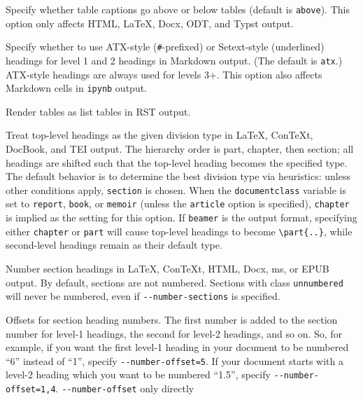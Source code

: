 \documentclass[
  b5paper
]{book}
\begin{document}
\begin{description}
Specify whether table captions go above or below tables (default is
\texttt{above}). This option only affects HTML, LaTeX, Docx, ODT, and
Typst output.
\item[\texttt{-\/-markdown-headings=setext}\textbar{}\texttt{atx}]
Specify whether to use ATX-style (\texttt{\#}-prefixed) or Setext-style
(underlined) headings for level 1 and 2 headings in Markdown output.
(The default is \texttt{atx}.) ATX-style headings are always used for
levels 3+. This option also affects Markdown cells in \texttt{ipynb}
output.
\item[\texttt{-\/-list-tables{[}=true\textbar{}false{]}}]
Render tables as list tables in RST output.
\item[\texttt{-\/-top-level-division=default}\textbar{}\texttt{section}\textbar{}\texttt{chapter}\textbar{}\texttt{part}]
Treat top-level headings as the given division type in LaTeX, ConTeXt,
DocBook, and TEI output. The hierarchy order is part, chapter, then
section; all headings are shifted such that the top-level heading
becomes the specified type. The default behavior is to determine the
best division type via heuristics: unless other conditions apply,
\texttt{section} is chosen. When the \texttt{documentclass} variable is
set to \texttt{report}, \texttt{book}, or \texttt{memoir} (unless the
\texttt{article} option is specified), \texttt{chapter} is implied as
the setting for this option. If \texttt{beamer} is the output format,
specifying either \texttt{chapter} or \texttt{part} will cause top-level
headings to become \texttt{\textbackslash{}part\{..\}}, while
second-level headings remain as their default type.
\item[\texttt{-N},
\texttt{-\/-number-sections={[}true\textbar{}false{]}}]
Number section headings in LaTeX, ConTeXt, HTML, Docx, ms, or EPUB
output. By default, sections are not numbered. Sections with class
\texttt{unnumbered} will never be numbered, even if
\texttt{-\/-number-sections} is specified.
\item[\texttt{-\/-number-offset=}\emph{NUMBER}{[}\texttt{,}\emph{NUMBER}\texttt{,}\emph{\ldots{}}{]}]
Offsets for section heading numbers. The first number is added to the
section number for level-1 headings, the second for level-2 headings,
and so on. So, for example, if you want the first level-1 heading in
your document to be numbered ``6'' instead of ``1'', specify
\texttt{-\/-number-offset=5}. If your document starts with a level-2
heading which you want to be numbered ``1.5'', specify
\texttt{-\/-number-offset=1,4}. \texttt{-\/-number-offset} only directly

\end{description}
\end{document}
